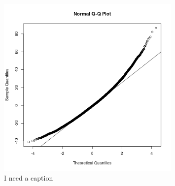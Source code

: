 \documentclass[12pt]{article}
\begin{document}
\begin{figure}[h!]
	\centering
	\includegraphics[width = 0.8\textwidth]
	{../figure/unnamed-chunk-2-1}
	\caption{I need a caption}
	\label{qq}
\end{figure}
\end{document}
